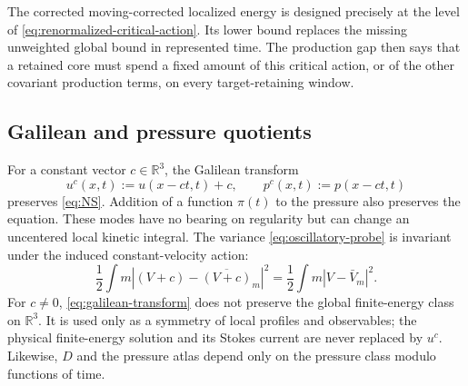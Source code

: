 \documentclass[11pt]{amsart}
\numberwithin{equation}{section}
\theoremstyle{plain}
\theoremstyle{definition}
\theoremstyle{remark}
\newcommand{\R}{\mathbb R}
\begin{document}
The corrected moving-corrected localized energy is designed precisely at the level of
\eqref{eq:renormalized-critical-action}.  Its lower bound replaces the missing
unweighted global bound in represented time.  The production gap then says
that a retained core must spend a fixed amount of this critical action, or of
the other covariant production terms, on every target-retaining window.

\subsection{Galilean and pressure quotients}

For a constant vector \(c\in\R^3\), the Galilean transform
\begin{equation}\label{eq:galilean-transform}
 u^c(x,t):=u(x-ct,t)+c,
 \qquad
 p^c(x,t):=p(x-ct,t)
\end{equation}
preserves \eqref{eq:NS}.  Addition of a function \(\pi(t)\) to the pressure
also preserves the equation.  These modes have no bearing on regularity but
can change an uncentered local kinetic integral.  The variance
\eqref{eq:oscillatory-probe} is invariant under the induced constant-velocity
action:
\begin{equation}\label{eq:variance-galilean-invariance}
 \frac12\int m|(V+c)-\overline{(V+c)}_m|^2
 =\frac12\int m|V-\bar V_m|^2.
\end{equation}
For \(c\ne0\), \eqref{eq:galilean-transform} does not preserve the global
finite-energy class on \(\R^3\).  It is used only as a symmetry of local
profiles and observables; the physical finite-energy solution and its Stokes
current are never replaced by \(u^c\).
Likewise, \(D\) and the pressure atlas depend only on the pressure class
modulo functions of time.
\end{document}
